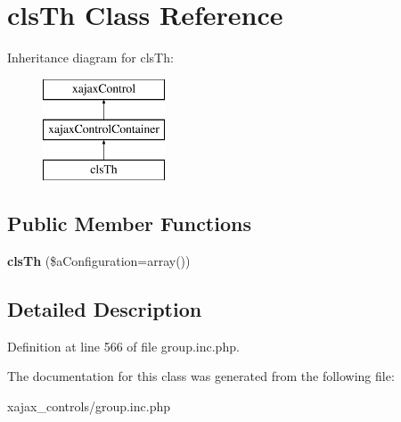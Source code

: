 \hypertarget{classclsTh}{
\section{clsTh Class Reference}
\label{classclsTh}
}
Inheritance diagram for clsTh:\begin{figure}[H]
\begin{center}
\leavevmode
\includegraphics[height=3.000000cm]{classclsTh}
\end{center}
\end{figure}
\subsection*{Public Member Functions}
\begin{DoxyCompactItemize}
\item 
\hypertarget{classclsTh_aa9a5e9f35c936537c5460fb1e690a1f4}{
{\bfseries clsTh} (\$aConfiguration=array())}
\label{classclsTh_aa9a5e9f35c936537c5460fb1e690a1f4}

\end{DoxyCompactItemize}


\subsection{Detailed Description}


Definition at line 566 of file group.inc.php.



The documentation for this class was generated from the following file:\begin{DoxyCompactItemize}
\item 
xajax\_\-controls/group.inc.php\end{DoxyCompactItemize}
